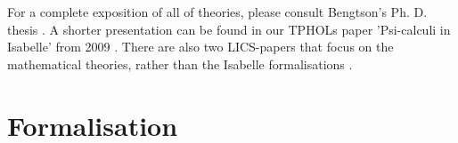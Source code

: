 \documentclass[11pt,a4paper]{article}
\begin{document}
For a complete exposition of all of theories, please consult Bengtson's
Ph. D. thesis \cite{bengtson:thesis}. A shorter presentation can be found in our TPHOLs paper
'Psi-calculi in Isabelle' from 2009 \cite{bengtson:tphols09}. There are also two LICS-papers that focus on the mathematical theories, rather than the Isabelle formalisations \cite{bengtson:lics09, johansson:lics10}.

\section{Formalisation}





\end{document}
